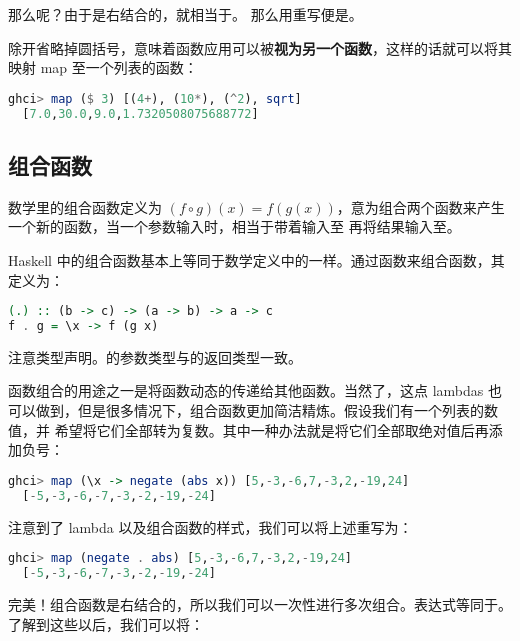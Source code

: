 \documentclass[./main.tex]{subfiles}
\begin{document}
那么呢？由于\acode{\$}是右结合的，就相当于。
那么用\acode{\$}重写便是。

除开省略掉圆括号，\acode{\$}意味着函数应用可以被\textbf{视为另一个函数}，这样的话就可以将其映射 map 至一个列表的函数：

\begin{lstlisting}[language=Haskell]
  ghci> map ($ 3) [(4+), (10*), (^2), sqrt]
  [7.0,30.0,9.0,1.7320508075688772]
\end{lstlisting}

\subsection*{组合函数}

数学里的组合函数定义为 $(f \circ g)(x) = f(g(x))$，意为组合两个函数来产生一个新的函数，当一个参数输入时，相当于带着输入至
再将结果输入至。

Haskell 中的组合函数基本上等同于数学定义中的一样。通过函数来组合函数，其定义为：

\begin{lstlisting}[language=Haskell]
(.) :: (b -> c) -> (a -> b) -> a -> c
f . g = \x -> f (g x)
\end{lstlisting}

注意类型声明。的参数类型与的返回类型一致。

函数组合的用途之一是将函数动态的传递给其他函数。当然了，这点 lambdas 也可以做到，但是很多情况下，组合函数更加简洁精炼。假设我们有一个列表的数值，并
希望将它们全部转为复数。其中一种办法就是将它们全部取绝对值后再添加负号：

\begin{lstlisting}[language=Haskell]
  ghci> map (\x -> negate (abs x)) [5,-3,-6,7,-3,2,-19,24]
  [-5,-3,-6,-7,-3,-2,-19,-24]
\end{lstlisting}

注意到了 lambda 以及组合函数的样式，我们可以将上述重写为：

\begin{lstlisting}[language=Haskell]
  ghci> map (negate . abs) [5,-3,-6,7,-3,2,-19,24]
  [-5,-3,-6,-7,-3,-2,-19,-24]
\end{lstlisting}

完美！组合函数是右结合的，所以我们可以一次性进行多次组合。表达式等同于。了解到这些以后，我们可以将：
\end{document}
